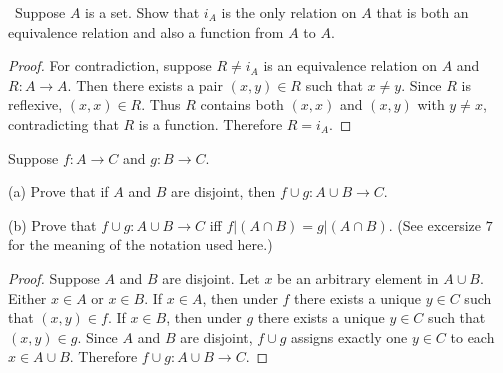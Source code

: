 \begin{tcolorbox}[title=Problem 11, breakable]\
    Suppose $A$ is a set. 
    Show that $i_A$ is the only relation on $A$ that 
        is both an equivalence relation and also a function from $A$ to $A$.
\end{tcolorbox}

\begin{proof}
    For contradiction, suppose $R \ne i_A$ is an equivalence relation on $A$
        and $R : A \rightarrow A$.
    Then there exists a pair $(x, y) \in R$ such that $x \ne y$.
    Since $R$ is reflexive, $(x, x) \in R$.
    Thus $R$ contains both $(x, x)$ and $(x, y)$ with $y \ne x$,
        contradicting that $R$ is a function.
    Therefore $R = i_A$.
\end{proof}

\begin{tcolorbox}[title=Problem 12, breakable]
    Suppose $f : A \rightarrow C$ and $g : B \rightarrow C$.

    (a) Prove that if $A$ and $B$ are disjoint, then $f \cup g : A \cup B \rightarrow C$.

    (b) Prove that $f \cup g : A \cup B \rightarrow C$ iff $f | (A \cap B) = g | (A \cap B)$.
        (See excersize $7$ for the meaning of the notation used here.)
\end{tcolorbox}

\begin{proof}
    Suppose $A$ and $B$ are disjoint.
    Let $x$ be an arbitrary element in $A \cup B$.
    Either $x \in A$ or $x \in B$.
    If $x \in A$, then under $f$ there exists a unique $y \in C$
        such that $(x, y) \in f$.
    If $x \in B$, then under $g$ there exists a unique $y \in C$
        such that $(x, y) \in g$.
    Since $A$ and $B$ are disjoint, $f \cup g$ assigns exactly one $y \in C$
        to each $x \in A \cup B$.
    Therefore $f \cup g : A \cup B \rightarrow C$.
\end{proof}

